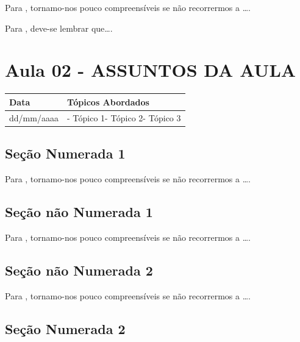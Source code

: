 \documentclass[
]{book}
\begin{document}
Para \citet{BOCK2001}, tornamo-nos pouco compreensíveis se não recorrermos a \ldots.

Para \citet{DAVIDOFF2001}, deve-se lembrar que\ldots.

\hypertarget{aula-02---assuntos-da-aula}{%
\section{Aula 02 - ASSUNTOS DA AULA}\label{aula-02---assuntos-da-aula}}

\begin{longtable}[]{@{}ll@{}}
\toprule()
Data & Tópicos Abordados \\
\midrule()
\endhead
dd/mm/aaaa & - Tópico 1- Tópico 2- Tópico 3 \\
\bottomrule()
\end{longtable}

\hypertarget{seuxe7uxe3o-numerada-1-3}{%
\subsection{Seção Numerada 1}\label{seuxe7uxe3o-numerada-1-3}}

Para \citet{BOCK2001}, tornamo-nos pouco compreensíveis se não recorrermos a \ldots.

\hypertarget{seuxe7uxe3o-nuxe3o-numerada-1-6}{%
\subsection*{Seção não Numerada 1}\label{seuxe7uxe3o-nuxe3o-numerada-1-6}}

Para \citet{BOCK2001}, tornamo-nos pouco compreensíveis se não recorrermos a \ldots.

\hypertarget{seuxe7uxe3o-nuxe3o-numerada-2-9}{%
\subsection*{Seção não Numerada 2}\label{seuxe7uxe3o-nuxe3o-numerada-2-9}}

Para \citet{BOCK2001}, tornamo-nos pouco compreensíveis se não recorrermos a \ldots.

\hypertarget{seuxe7uxe3o-numerada-2-3}{%
\subsection{Seção Numerada 2}\label{seuxe7uxe3o-numerada-2-3}}
\end{document}
